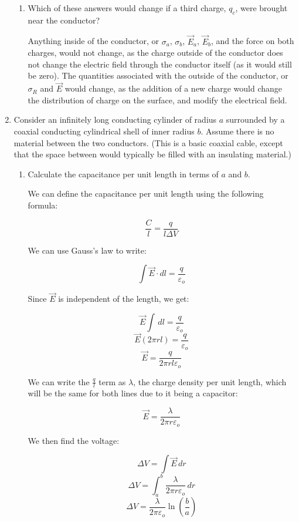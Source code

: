 \begin{enumerate}
\begin{enumerate}
      \item Which of these answers would change if a third charge, $q_c$, were brought near the conductor?

        Anything inside of the conductor, or $\sigma_a$, $\sigma_b$, $\vec{E}_a$, $\vec{E}_b$, and the force on both charges, would not change, as the charge outside of the conductor does not change the electric field through the conductor itself (as it would still be zero). The quantities associated with the outside of the conductor, or $\sigma_R$ and $\vec{E}$ would change, as the addition of a new charge would change the distribution of charge on the surface, and modify the electrical field.

    \end{enumerate}

  \item Consider an infinitely long conducting cylinder of radius $a$ surrounded by a coaxial conducting cylindrical shell of inner radius $b$. Assume there is no material between the two conductors.  (This is a basic coaxial cable, except that the space between would typically be filled with an insulating material.)

    \begin{enumerate}

      \item Calculate the capacitance per unit length in terms of $a$ and $b$.

        We can define the capacitance per unit length using the following formula:

        $$\frac{C}{l}=\frac{q}{l\Delta V}$$

        We can use Gauss's law to write:

        $$\int \vec{E}\cdot dl=\frac{q}{\varepsilon_o}$$

        Since $\vec{E}$ is independent of the length, we get:

        $$\vec{E}\int\,dl=\frac{q}{\varepsilon_o}$$
        $$\vec{E}(2\pi r l)=\frac{q}{\varepsilon_o}$$
        $$\vec{E}=\frac{q}{2\pi r l\varepsilon_o}$$

        We can write the $\frac{q}{l}$ term as $\lambda$, the charge density per unit length, which will be the same for both lines due to it being a capacitor:

        $$\vec{E}=\frac{\lambda}{2\pi r\varepsilon_o}$$

        We then find the voltage:

        $$\Delta V=\int\vec{E}\,dr$$
        $$\Delta V=\int_a^b\frac{\lambda}{2\pi r\varepsilon_o}\,dr$$
        $$\Delta V=\frac{\lambda}{2\pi\varepsilon_o}\ln(\frac{b}{a})$$


\end{enumerate}
\end{enumerate}
